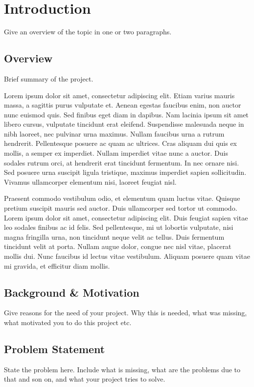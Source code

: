 \documentclass[minor, project]{gptcmdy}
\begin{document}
\tableofcontents

\chapter{Introduction}

Give an overview of the topic in one or two paragraphs.

\section{Overview}
Brief summary of the project.

Lorem ipsum dolor sit amet, consectetur adipiscing elit. Etiam varius mauris massa, a sagittis purus vulputate et. Aenean egestas faucibus enim, non auctor nunc euismod quis. Sed finibus eget diam in dapibus. Nam lacinia ipsum sit amet libero cursus, vulputate tincidunt erat eleifend. Suspendisse malesuada neque in nibh laoreet, nec pulvinar urna maximus. Nullam faucibus urna a rutrum hendrerit. Pellentesque posuere ac quam ac ultrices. Cras aliquam dui quis ex mollis, a semper ex imperdiet. Nullam imperdiet vitae nunc a auctor. Duis sodales rutrum orci, at hendrerit erat tincidunt fermentum. In nec ornare nisi. Sed posuere urna suscipit ligula tristique, maximus imperdiet sapien sollicitudin. Vivamus ullamcorper elementum nisi, laoreet feugiat nisl.

Praesent commodo vestibulum odio, et elementum quam luctus vitae. Quisque pretium suscipit mauris sed auctor. Duis ullamcorper sed tortor ut commodo. Lorem ipsum dolor sit amet, consectetur adipiscing elit. Duis feugiat sapien vitae leo sodales finibus ac id felis. Sed pellentesque, mi ut lobortis vulputate, nisi magna fringilla urna, non tincidunt neque velit ac tellus. Duis fermentum tincidunt velit at porta. Nullam augue dolor, congue nec nisl vitae, placerat mollis dui. Nunc faucibus id lectus vitae vestibulum. Aliquam posuere quam vitae mi gravida, et efficitur diam mollis.


\section{Background \& Motivation}
Give reasons for the need of your project. Why this is needed, what was missing, what motivated you to do this project etc.

\section{Problem Statement}
State the problem here. Include what is missing, what are the problems due to that and son on, and what your project tries to solve.
\end{document}
